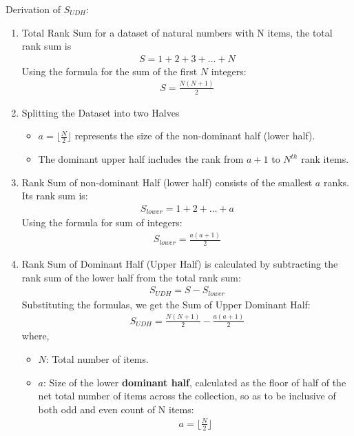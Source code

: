 \documentclass[a4paper,fleqn,review]{cas-sc}
\begin{document}
Derivation of $S_{UDH}$:
\begin{enumerate}
\item[]{
	Total Rank Sum for a dataset of natural numbers with N items, the total rank sum is
	\begin{align*}
		S = 1 + 2 + 3 + \ldots + N
	\end{align*}
	Using the formula for the sum of the first \( N \) integers:
	\begin{align*}
		S = \frac{N(N + 1)}{2}
	\end{align*}
}

\item[]{
	Splitting the Dataset into two Halves
	\begin{itemize}
	  \item \( a = \lfloor \frac{N}{2} \rfloor \) represents the size of the non-dominant half (lower half).
	  \item The dominant upper half includes the rank from \( a + 1 \) to \(N^{th}\) rank items.
	\end{itemize}
}

\item[]{Rank Sum of non-dominant Half (lower half) consists of the smallest \( a \) ranks. Its rank sum is:
	\begin{align*}
		S_{lower} = 1 + 2 + \ldots + a
	\end{align*}
	Using the formula for sum of integers:
	\begin{align*}
		S_{lower} = \frac{a(a+1)}{2}
	\end{align*}
}

\item[]{Rank Sum of Dominant Half (Upper Half) is calculated by subtracting the rank sum of the lower half from the total rank sum:
	\begin{align*}
	S_{UDH} = S - S_{lower}
	\end{align*}
	Substituting the formulas, we get the Sum of Upper Dominant Half:
	\begin{align*}
	S_{UDH} = \frac{N(N + 1)}{2} - \frac{a(a+1)}{2}
	\end{align*}
}
where,
\begin{itemize}
  \item[] \( N \): Total number of items.
  \item[] \( a \): Size of the lower \textbf{dominant half}, calculated as the floor of half of the net total number of items across the collection, so as to be inclusive of both odd and even count of N items:
  \begin{align*}
  a = \lfloor \frac{N}{2} \rfloor
  \end{align*}
\end{itemize}
\end{enumerate}
\end{document}
